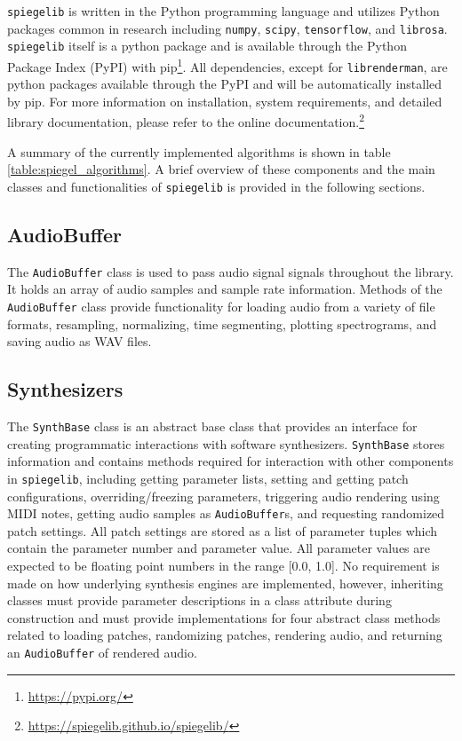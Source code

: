  \texttt{spiegelib} is written in the Python programming language and utilizes Python packages common in research including \texttt{numpy}, \texttt{scipy}, \texttt{tensorflow}, and \texttt{librosa}. \texttt{spiegelib} itself is a python package and is available through the Python Package Index (PyPI) with pip\footnote{\url{https://pypi.org/}}. All dependencies, except for \texttt{librenderman}, are python packages available through the PyPI and will be automatically installed by pip. For more information on installation, system requirements, and detailed library documentation, please refer to the  online documentation.\footnote{\url{https://spiegelib.github.io/spiegelib/}}
 
 A summary of the currently implemented algorithms is shown in table \ref{table:spiegel_algorithms}. A brief overview of these components and the main classes and functionalities of \texttt{spiegelib} is provided in the following sections.
 
 
 
\subsection{AudioBuffer}
The \texttt{AudioBuffer} class is used to pass audio signal signals throughout the library. It holds an array of audio samples and sample rate information. Methods of the \texttt{AudioBuffer} class provide functionality for loading audio from a variety of file formats, resampling, normalizing, time segmenting, plotting spectrograms, and saving audio as WAV files.

\subsection{Synthesizers}
The \texttt{SynthBase} class is an abstract base class that provides an interface for creating programmatic interactions with software synthesizers. \texttt{SynthBase} stores information and contains methods required for interaction with other components in \texttt{spiegelib}, including getting parameter lists, setting and getting patch configurations, overriding/freezing parameters, triggering audio rendering using MIDI notes, getting audio samples as \texttt{AudioBuffer}s, and requesting randomized patch settings. All patch settings are stored as a list of parameter tuples which contain the parameter number and parameter value. All parameter values are expected to be floating point numbers in the range [0.0, 1.0]. No requirement is made on how underlying synthesis engines are implemented, however, inheriting classes must provide parameter descriptions in a class attribute during construction and must provide implementations for four abstract class methods related to loading patches, randomizing patches, rendering audio, and returning an \texttt{AudioBuffer} of rendered audio.

